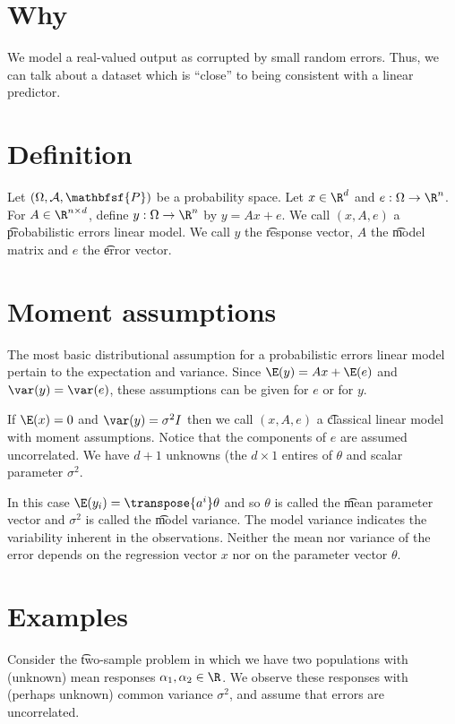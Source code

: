 
\section*{Why}

We model a real-valued output as corrupted by small random errors.
Thus, we can talk about a dataset which is ``close'' to being consistent with a linear predictor.

\section*{Definition}

Let $(\Omega , \mathcal{A} , \mathbfsf{P} )$ be a probability space.
Let $x \in \R ^d$ and $e: \Omega  \to \R ^n$.
For $A \in \R ^{n \times d}$, define $y: \Omega  \to \R ^n$ by $y = Ax + e$.
We call $(x, A, e)$ a \t{probabilistic errors linear model}.
We call $y$ the \t{response vector}, $A$ the \t{model matrix} and $e$ the \t{error vector}.

\section*{Moment assumptions}

The most basic distributional assumption for a probabilistic errors linear model pertain to the expectation and variance.
Since $\E (y) = Ax + \E (e)$ and $\var(y) = \var(e)$, these assumptions can be given for $e$ or for $y$.

If $\E (x) = 0$ and $\var(y) = \sigma ^2I$ then we call $(x, A, e)$ a \t{classical linear model with moment assumptions}.
Notice that the components of $e$ are assumed uncorrelated.
We have $d + 1$ unknowns (the $d \times 1$ entires of $\theta $ and scalar parameter $\sigma ^2$.

In this case $\E (y_i) = \transpose{a^i}\theta $ and so $\theta $ is called the \t{mean parameter vector} and $\sigma ^2$ is called the \t{model variance}.
The model variance indicates the variability inherent in the observations.
Neither the mean nor variance of the error depends on the regression vector $x$ nor on the parameter vector $\theta $.

\section*{Examples}

Consider the \t{two-sample problem} in which we have two populations with (unknown) mean responses $\alpha _1, \alpha _2 \in \R $.
We observe these responses with (perhaps unknown) common variance $\sigma ^2$, and assume that errors are uncorrelated.

